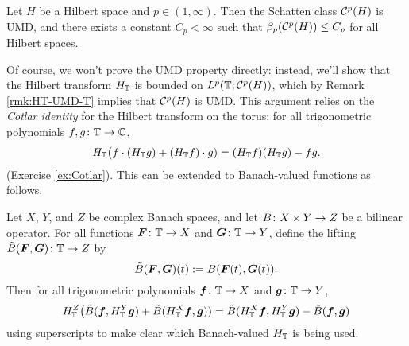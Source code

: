 \begin{thm}\label{thm:Schatten-UMD}
  Let $H$ be a Hilbert space and $p \in (1,\infty)$.
  Then the Schatten class $\mathcal{C}^{p}(H)$ is UMD, and there exists a constant $C_{p} < \infty$ such that $\beta_{p}(\mathcal{C}^{p}(H)) \leq C_{p}$ for all Hilbert spaces.
\end{thm}

Of course, we won't prove the UMD property directly: instead, we'll show that the Hilbert transform $H_{\mathbb{T}}$ is bounded on $L^p(\mathbb{T}; \mathcal{C}^{p}(H))$, which by Remark \ref{rmk:HT-UMD-T} implies that $\mathcal{C}^{p}(H)$ is UMD.
This argument relies on the \emph{Cotlar identity} for the Hilbert transform on the torus: for all trigonometric polynomials $f,g \colon \mathbb{T} \rightarrow \mathbb{C}$,
\begin{equation}\label{eq:Cotlar}
  H_{\mathbb{T}}\big(f \cdot (H_{\mathbb{T}} g) + (H_{\mathbb{T}} f) \cdot g) = (H_{\mathbb{T}} f)(H_{\mathbb{T}} g) - fg.
\end{equation}
(Exercise \ref{ex:Cotlar}).
This can be extended to Banach-valued functions as follows.

\begin{lem}\label{lem:Cotlar-BV}
  Let $X$, $Y$, and $Z$ be complex Banach spaces, and let $B \colon X \times Y \rightarrow Z$ be a bilinear operator.
  For all functions $\bm{F} \colon \mathbb{T} \to X$ and $\bm{G} \colon \mathbb{T} \to Y$, define the lifting $\tilde{B}(\bm{F},\bm{G}) \colon \mathbb{T} \rightarrow Z$ by
  \begin{equation*}
    \tilde{B}(\bm{F},\bm{G})(t) := B(\bm{F}(t), \bm{G}(t)).
  \end{equation*}
  Then for all trigonometric polynomials $\bm{f} \colon \mathbb{T} \rightarrow X$ and $\bm{g} \colon \mathbb{T} \rightarrow Y$,
  \begin{equation*}
    H_{\mathbb{T}}^{Z}\big(\tilde{B}(\bm{f}, H_{\mathbb{T}}^{Y} \bm{g}) + \tilde{B}(H_{\mathbb{T}}^{X} \bm{f}, \bm{g})) = \tilde{B}(H_{\mathbb{T}}^{X} \bm{f}, H_{\mathbb{T}}^{Y} \bm{g}) - \tilde{B}(\bm{f}, \bm{g})
  \end{equation*}
  using superscripts to make clear which Banach-valued $H_{\mathbb{T}}$ is being used.
\end{lem}

